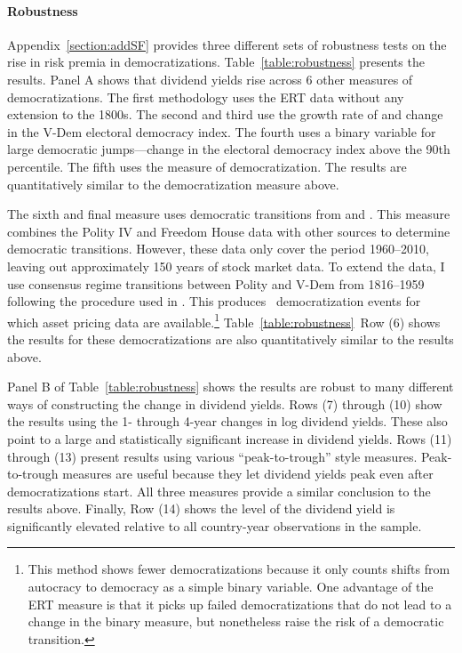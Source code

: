 \documentclass[12pt]{article}
\numberwithin{equation}{section}
\begin{document}
\paragraph{Robustness}

Appendix~\ref{section:addSF} provides three different sets of robustness tests on the rise in risk premia in democratizations. Table~\ref{table:robustness} presents the results.  Panel A shows that dividend yields rise across 6 other measures of democratizations. The first methodology uses the ERT data without any extension to the 1800s. The second and third use the growth rate of and change in the V-Dem electoral democracy index. The fourth uses a binary variable for large democratic jumps---change in the electoral democracy index above the 90th percentile. The fifth uses the \cite{Lindberg2018} measure of democratization. The results are quantitatively similar to the democratization measure above.

The sixth and final measure uses democratic transitions from \cite{Papaioannou2008} and \cite{Acemoglu2019}. This measure combines the Polity IV and Freedom House data with other sources to determine democratic transitions. However, these data only cover the period 1960--2010, leaving out approximately 150 years of stock market data. To extend the data, I use consensus regime transitions between Polity and V-Dem from 1816--1959 following the procedure used in \citeauthor{Acemoglu2019}.  This produces \tabBThreeAceDem\ democratization events for which asset pricing data are available.\footnote{This method shows fewer democratizations because it only counts shifts from autocracy to democracy as a simple binary variable. One advantage of the ERT measure is that it picks up failed democratizations that do not lead to a change in the binary measure, but nonetheless raise the risk of a democratic transition.} Table~\ref{table:robustness}~Row (6) shows the results for these democratizations are also quantitatively similar to the results above.

Panel B of Table~\ref{table:robustness} shows the results are robust to many different ways of constructing the change in dividend yields.  Rows (7) through (10) show the results using the 1- through 4-year changes in log dividend yields. These also point to a large and statistically significant increase in dividend yields. Rows (11) through (13) present results using various ``peak-to-trough'' style measures. Peak-to-trough measures are useful because they let dividend yields peak even after democratizations start. All three measures provide a similar conclusion to the results above.  Finally, Row (14) shows the level of the dividend yield is significantly elevated relative to all country-year observations in the sample.
\end{document}
